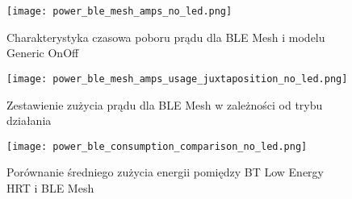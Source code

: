 \begin{figure}[!htb]
	\centering \texttt{[image: power\_ble\_mesh\_amps\_no\_led.png]} 
	\caption{Charakterystyka czasowa poboru prądu dla BLE Mesh i modelu Generic OnOff}
	\label{rys:power_ble_mesh_amps}
\end{figure}

\lipsum[1-3]
\begin{figure}[!htb]
	\centering \texttt{[image: power\_ble\_mesh\_amps\_usage\_juxtaposition\_no\_led.png]} 
	\caption{Zestawienie zużycia prądu dla BLE Mesh w zależności od trybu działania}
	\label{rys:power_ble_mesh_amps_usage_juxtaposition}
\end{figure}

\lipsum[1-3]
\begin{figure}[!htb]
	\centering \texttt{[image: power\_ble\_consumption\_comparison\_no\_led.png]} 
	\caption{Porównanie średniego zużycia energii pomiędzy BT Low Energy HRT i BLE Mesh}
	\label{rys:power_ble_consumption_comparison}
\end{figure}


